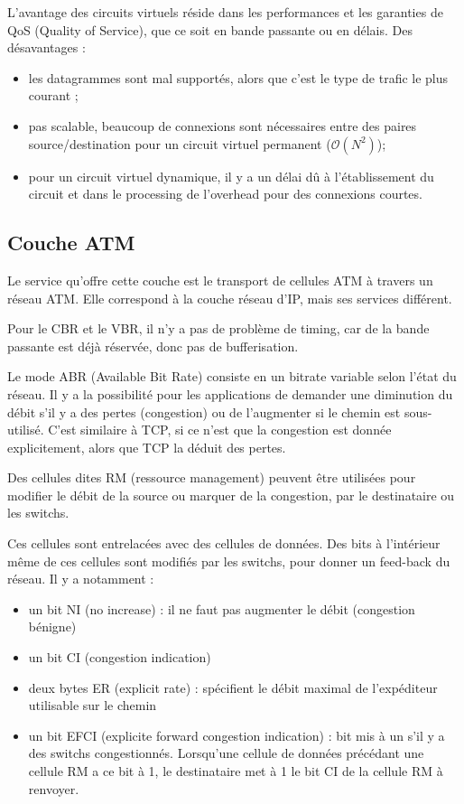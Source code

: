 	L'avantage des circuits virtuels réside dans les performances et les garanties de QoS (Quality of Service), que ce soit en bande passante ou en délais.
	Des désavantages :
	
	\begin{itemize}
		\item les datagrammes sont mal supportés, alors que c'est le type de trafic le plus courant ;
		\item pas scalable, beaucoup de connexions sont nécessaires entre des paires source/destination pour un circuit virtuel permanent ($\mathcal{O}(N^2)$);
		\item pour un circuit virtuel dynamique, il y a un délai dû à l'établissement du circuit et dans le processing de l'overhead pour des connexions courtes.
	\end{itemize}
	
	
	\subsection{Couche ATM}
	
	Le service qu'offre cette couche est le transport de cellules ATM à travers un réseau ATM. Elle correspond à la couche réseau d'IP, mais ses services différent.
	
	
	Pour le CBR et le VBR, il n'y a pas de problème de timing, car de la bande passante est déjà réservée, donc pas de bufferisation.
	
	Le mode ABR (Available Bit Rate) consiste en un bitrate variable selon l'état du réseau. Il y a la possibilité pour les applications de demander une diminution du débit s'il y a des pertes (congestion) ou de l'augmenter si le chemin est sous-utilisé. C'est similaire à TCP, si ce n'est que la congestion est donnée explicitement, alors que TCP la déduit des pertes.
	
		
	Des cellules dites RM (ressource management) peuvent être utilisées pour modifier le débit de la source ou marquer de la congestion, par le destinataire ou les switchs.
	
	
	Ces cellules sont entrelacées avec des cellules de données. Des bits à l'intérieur même de ces cellules sont modifiés par les switchs, pour donner un feed-back du réseau. Il y a notamment  :
	
	\begin{itemize}
		\item un bit NI (no increase) : il ne faut pas augmenter le débit (congestion bénigne)
		\item un bit CI (congestion indication)
		\item deux bytes ER (explicit rate) : spécifient le débit maximal de l'expéditeur utilisable sur le chemin
		\item un bit EFCI (explicite forward congestion indication) : bit mis à un s'il y a des switchs congestionnés. Lorsqu'une cellule de données précédant une cellule RM a ce bit à 1, le destinataire met à 1 le bit CI de la cellule RM à renvoyer.
	\end{itemize}
	
